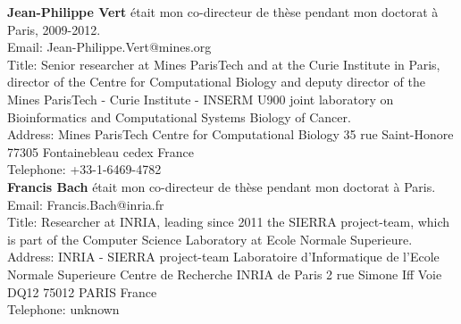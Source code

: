 \documentclass{article}
\begin{document}
{\bf Jean-Philippe Vert} était mon co-directeur de thèse pendant mon doctorat à Paris, 2009-2012.\\
Email: Jean-Philippe.Vert@mines.org\\
Title: Senior researcher at Mines ParisTech and at the Curie Institute in Paris, director of the Centre for Computational Biology and deputy director of the Mines ParisTech - Curie Institute - INSERM U900 joint laboratory on Bioinformatics and Computational Systems Biology of Cancer.\\
Address: Mines ParisTech
Centre for Computational Biology
35 rue Saint-Honore
77305 Fontainebleau cedex
France\\
Telephone: +33-1-6469-4782\\

{\bf Francis Bach} était mon co-directeur de thèse pendant mon doctorat à Paris.\\
Email: Francis.Bach@inria.fr\\
Title: Researcher at INRIA, leading since 2011 the SIERRA project-team, which is part of the Computer Science Laboratory at Ecole Normale Superieure.\\
Address: INRIA - SIERRA project-team
Laboratoire d'Informatique de l'Ecole Normale Superieure 
Centre de Recherche INRIA de Paris
2 rue Simone Iff
Voie DQ12
75012 PARIS
France\\
Telephone: unknown
\end{document}
